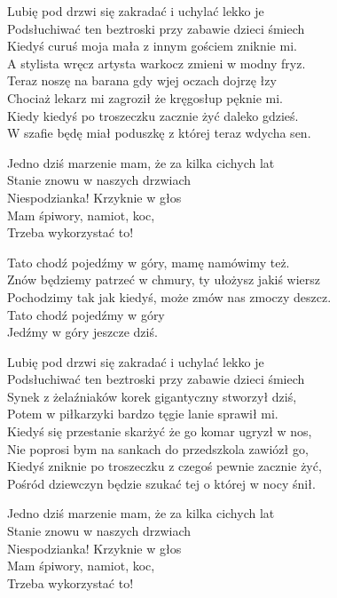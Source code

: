 \begin{text}
    Lubię pod drzwi się zakradać i uchylać lekko je \\
    Podsłuchiwać ten beztroski przy zabawie dzieci śmiech\\
    Kiedyś curuś moja mała z innym gościem zniknie mi.\\
    A stylista wręcz artysta warkocz zmieni w modny fryz.\\
    Teraz noszę na barana gdy wjej oczach dojrzę łzy\\
    Chociaż lekarz mi zagroził że kręgosłup pęknie mi.\\
    Kiedy kiedyś po troszeczku zacznie żyć daleko gdzieś.\\
    W szafie będę miał poduszkę z której teraz wdycha sen.
        
    Jedno dziś marzenie mam, że za kilka cichych lat\\
    Stanie znowu w naszych drzwiach\\
    Niespodzianka! Krzyknie w głos\\
    Mam śpiwory, namiot, koc,\\
    Trzeba wykorzystać to!

    Tato chodź pojedźmy w góry, mamę namówimy też.\\
    Znów będziemy patrzeć w chmury, ty ułożysz jakiś wiersz\\
    Pochodzimy tak jak kiedyś, może zmów nas zmoczy deszcz.\\
    Tato chodź pojedźmy w góry\\
    Jedźmy w góry jeszcze dziś.

    Lubię pod drzwi się zakradać i uchylać lekko je\\
    Podsłuchiwać ten beztroski przy zabawie dzieci śmiech\\
    Synek z żelaźniaków korek gigantyczny stworzył dziś,\\
    Potem w piłkarzyki bardzo tęgie lanie sprawił mi.\\
    Kiedyś się przestanie skarżyć że go komar ugryzł w nos,\\
    Nie poprosi bym na sankach do przedszkola zawiózł go,\\
    Kiedyś zniknie po troszeczku z czegoś pewnie zacznie żyć,\\
    Pośród dziewczyn będzie szukać tej o której w nocy śnił.

    Jedno dziś marzenie mam, że za kilka cichych lat\\
    Stanie znowu w naszych drzwiach\\
    Niespodzianka! Krzyknie w głos\\
    Mam śpiwory, namiot, koc,\\
    Trzeba wykorzystać to!


\end{text}
